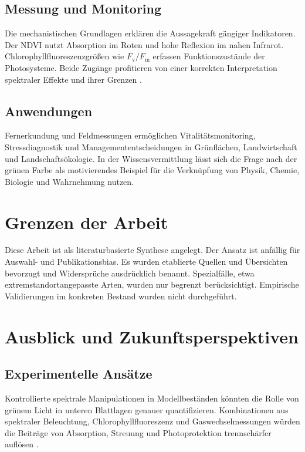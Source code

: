 \subsection{Messung und Monitoring}
Die mechanistischen Grundlagen erklären die Aussagekraft gängiger Indikatoren. Der NDVI nutzt Absorption im Roten und hohe Reflexion im nahen Infrarot. Chlorophyllfluoreszenzgrößen wie $F_\mathrm{v}/F_\mathrm{m}$ erfassen Funktionszustände der Photosysteme. Beide Zugänge profitieren von einer korrekten Interpretation spektraler Effekte und ihrer Grenzen \parencite{meyer2018photosynthese, zhao2012chlorophyll}.

\subsection{Anwendungen}
Fernerkundung und Feldmessungen ermöglichen Vitalitätsmonitoring, Stressdiagnostik und Managemententscheidungen in Grünflächen, Landwirtschaft und Landschaftsökologie. In der Wissensvermittlung lässt sich die Frage nach der grünen Farbe als motivierendes Beispiel für die Verknüpfung von Physik, Chemie, Biologie und Wahrnehmung nutzen.

\section{Grenzen der Arbeit}
Diese Arbeit ist als literaturbasierte Synthese angelegt. Der Ansatz ist anfällig für Auswahl- und Publikationsbias. Es wurden etablierte Quellen und Übersichten bevorzugt und Widersprüche ausdrücklich benannt. Spezialfälle, etwa extremstandortangepasste Arten, wurden nur begrenzt berücksichtigt. Empirische Validierungen im konkreten Bestand wurden nicht durchgeführt.

\section{Ausblick und Zukunftsperspektiven}
\subsection{Experimentelle Ansätze}
Kontrollierte spektrale Manipulationen in Modellbeständen könnten die Rolle von grünem Licht in unteren Blattlagen genauer quantifizieren. Kombinationen aus spektraler Beleuchtung, Chlorophyllfluoreszenz und Gaswechselmessungen würden die Beiträge von Absorption, Streuung und Photoprotektion trennschärfer auflösen \parencite{zhao2012chlorophyll, gao2010lightabsorption}.

